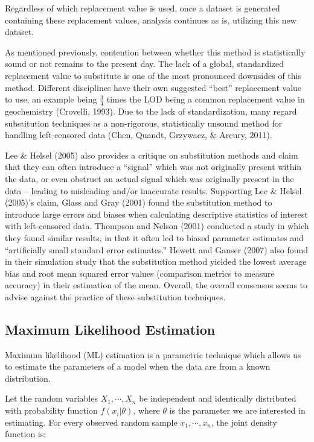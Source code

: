 \documentclass[12pt, twoside]{amherstthesis}
\begin{document}
Regardless of which replacement value is used, once a dataset is generated containing these replacement values, analysis continues as is, utilizing this new dataset.

As mentioned previously, contention between whether this method is statistically sound or not remains to the present day. The lack of a global, standardized replacement value to substitute is one of the most pronounced downsides of this method. Different disciplines have their own suggested ``best'' replacement value to use, an example being \(\frac{3}{4}\) times the LOD being a common replacement value in geochemistry (Crovelli, 1993). Due to the lack of standardization, many regard substitution techniques as a non-rigorous, statistically unsound method for handling left-censored data (Chen, Quandt, Grzywacz, \& Arcury, 2011).

Lee \& Helsel (2005) also provides a critique on substitution methods and claim that they can often introduce a ``signal'' which was not originally present within the data, or even obstruct an actual signal which was originally present in the data -- leading to misleading and/or inaccurate results. Supporting Lee \& Helsel (2005)'s claim, Glass and Gray (2001) found the substitution method to introduce large errors and biases when calculating descriptive statistics of interest with left-censored data. Thompson and Nelson (2001) conducted a study in which they found similar results, in that it often led to biased parameter estimates and ``artificially small standard error estimates.'' Hewett and Ganser (2007) also found in their simulation study that the substitution method yielded the lowest average bias and root mean squared error values (comparison metrics to measure accuracy) in their estimation of the mean. Overall, the overall consensus seems to advise against the practice of these substitution techniques.

\hypertarget{MLE}{%
\subsection{Maximum Likelihood Estimation}\label{MLE}}

Maximum likelihood (ML) estimation is a parametric technique which allows us to estimate the parameters of a model when the data are from a known distribution.

Let the random variables \(X_1, \cdots, X_n\) be independent and identically distributed with probability function \(f(x_i|\theta)\), where \(\theta\) is the parameter we are interested in estimating. For every observed random sample \(x_1,\cdots,x_n\), the joint density function is:
\end{document}
